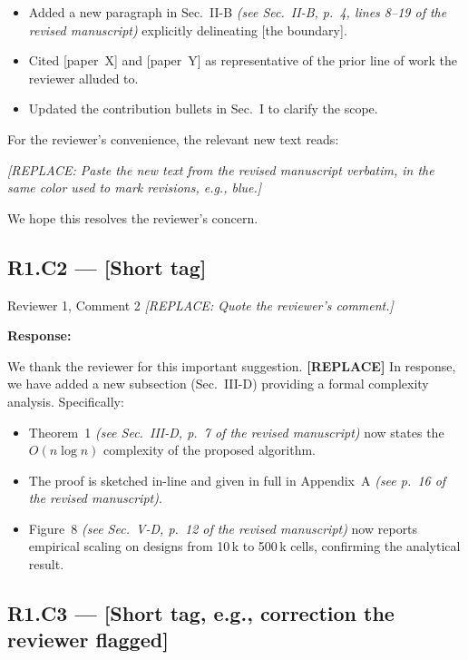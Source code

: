 \documentclass[11pt,letterpaper]{article}
\newcommand{\response}{\par\textbf{\color{responseaccent}Response:}\par}
\newcommand{\paperref}[1]{\textit{(see #1 of the revised manuscript)}}
\begin{document}
\begin{itemize}[itemsep=2pt,topsep=2pt]
    \item Added a new paragraph in Sec.~II-B
          \paperref{Sec.~II-B, p.~4, lines 8--19} explicitly delineating
          [the boundary].
    \item Cited [paper~X] and [paper~Y] as representative of the prior
          line of work the reviewer alluded to.
    \item Updated the contribution bullets in Sec.~I to clarify the
          scope.
\end{itemize}

\noindent For the reviewer's convenience, the relevant new text reads:

\begin{revexcerpt}
\textit{[REPLACE: Paste the new text from the revised manuscript
verbatim, in the same color used to mark revisions, e.g., blue.]}
\end{revexcerpt}

We hope this resolves the reviewer's concern.

\subsection*{R1.C2 --- [Short tag]}

\begin{reviewercomment}{Reviewer 1, Comment 2}
\textit{[REPLACE: Quote the reviewer's comment.]}
\end{reviewercomment}

\response We thank the reviewer for this important suggestion.
\textbf{[REPLACE]} In response, we have added a new subsection
(Sec.~III-D) providing a formal complexity analysis. Specifically:

\begin{itemize}[itemsep=2pt,topsep=2pt]
    \item Theorem~1 \paperref{Sec.~III-D, p.~7} now states the
          \(O(n \log n)\) complexity of the proposed algorithm.
    \item The proof is sketched in-line and given in full in
          Appendix~A \paperref{p.~16}.
    \item Figure~8 \paperref{Sec.~V-D, p.~12} now reports empirical
          scaling on designs from 10\,k to 500\,k cells, confirming
          the analytical result.
\end{itemize}

\subsection*{R1.C3 --- [Short tag, e.g., correction the reviewer flagged]}
\end{document}
